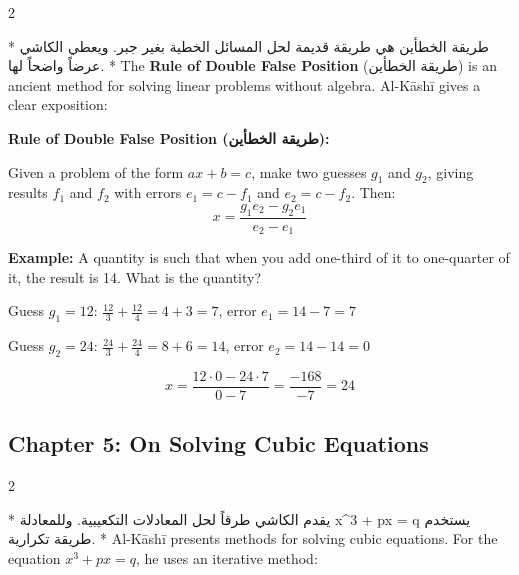 \documentclass[11pt,a4paper]{article}
\newcommand{\ar}[1]{\arabicfont\beginR #1\endR}
\newenvironment{bilingual}{%
  \vspace{0.3em}%
  \begin{paracol}{2}%
}{%
  \end{paracol}%
  \vspace{0.3em}%
}
\newenvironment{mathalgo}{%
  \par\vspace{0.3cm}
  \begin{framed}
  \setlength{\parindent}{0pt}
}{%
  \end{framed}
  \par\vspace{0.3cm}
}
\begin{document}
\begin{bilingual}
\switchcolumn[0]*
\ar{طريقة الخطأين هي طريقة قديمة لحل المسائل الخطية بغير جبر. ويعطي الكاشي عرضاً واضحاً لها.}
\switchcolumn[1]*
The \textbf{Rule of Double False Position} (\ar{طريقة الخطأين}) is an
ancient method for solving linear problems without algebra. Al-K\=ash\=i
gives a clear exposition:
\end{bilingual}

\begin{mathalgo}
\textbf{Rule of Double False Position (\ar{طريقة الخطأين}):}

Given a problem of the form $ax + b = c$, make two guesses $g_1$ and
$g_2$, giving results $f_1$ and $f_2$ with errors $e_1 = c - f_1$ and
$e_2 = c - f_2$. Then:
\[
x = \frac{g_1 e_2 - g_2 e_1}{e_2 - e_1}
\]

\textbf{Example:} A quantity is such that when you add one-third of it
  to one-quarter of it, the result is 14. What is the quantity?

Guess $g_1 = 12$: $\frac{12}{3} + \frac{12}{4} = 4 + 3 = 7$, error $e_1
= 14 - 7 = 7$

Guess $g_2 = 24$: $\frac{24}{3} + \frac{24}{4} = 8 + 6 = 14$, error $e_2
= 14 - 14 = 0$

\[
x = \frac{12 \cdot 0 - 24 \cdot 7}{0 - 7} = \frac{-168}{-7} = 24
\]
\end{mathalgo}

\subsection{Chapter 5: On Solving Cubic Equations}

\begin{bilingual}
\switchcolumn[0]*
\ar{يقدم الكاشي طرقاً لحل المعادلات التكعيبية. وللمعادلة x^3 + px = q يستخدم طريقة تكرارية.}
\switchcolumn[1]*
Al-K\=ash\=i presents methods for solving cubic equations. For the equation
$x^3 + px = q$, he uses an iterative method:
\end{bilingual}
\end{document}
